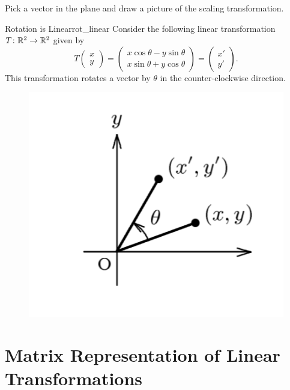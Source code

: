         
        \begin{exercise}
        Pick a vector in the plane and draw a picture of the scaling transformation.
        \end{exercise}
        
        \begin{ex}{Rotation is Linear}{rot_linear}
        Consider the following linear transformation $T\colon \mathbb{R}^2 \to \mathbb{R}^2$ given by
        \[
        T\begin{pmatrix} x\\ y \end{pmatrix} 
        = \begin{pmatrix} x \cos \theta - y \sin \theta\\ x \sin \theta +y \cos \theta \end{pmatrix} = \begin{pmatrix} x'\\ y' \end{pmatrix}.
        \]
        This transformation rotates a vector by $\theta$ in the counter-clockwise direction. 
        \begin{figure}[H]
            \centering
            \includegraphics[width=.3\textwidth]{Figures/plane_rotation.png}
        \end{figure}
        \end{ex}
        
    \section{Matrix Representation of Linear Transformations}
        
